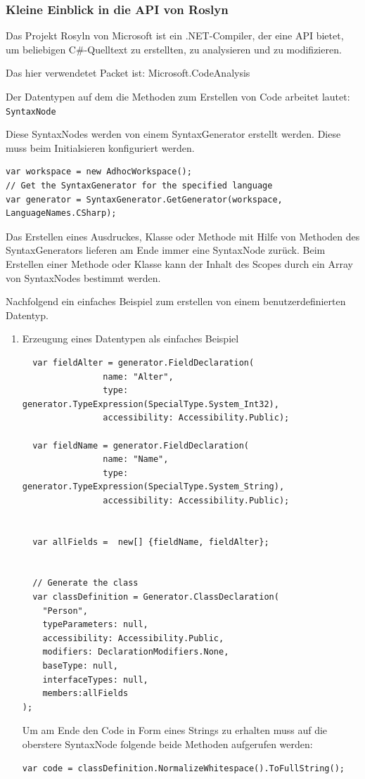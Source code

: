\documentclass[11pt]{article}
\begin{document}
\subsubsection{Kleine Einblick in die API von Roslyn}
\label{sec:orgheadline42}
Das Projekt Rosyln von Microsoft ist ein .NET-Compiler, der eine API bietet, um beliebigen C\#-Quelltext zu erstellten,
zu analysieren und zu modifizieren.

Das hier verwendetet Packet ist: Microsoft.CodeAnalysis

Der Datentypen auf dem die Methoden zum Erstellen von Code arbeitet lautet:
\texttt{SyntaxNode} 

Diese SyntaxNodes werden von einem SyntaxGenerator erstellt werden.
Diese muss beim Initialsieren konfiguriert werden.

\begin{verbatim}
var workspace = new AdhocWorkspace();
// Get the SyntaxGenerator for the specified language
var generator = SyntaxGenerator.GetGenerator(workspace, LanguageNames.CSharp);
\end{verbatim}


Das Erstellen eines Ausdruckes, Klasse oder Methode mit Hilfe von Methoden
des SyntaxGenerators lieferen am Ende immer eine SyntaxNode zurück.
Beim Erstellen einer Methode oder Klasse kann der Inhalt des Scopes durch
ein Array von SyntaxNodes bestimmt werden.

Nachfolgend ein einfaches Beispiel zum erstellen von einem
benutzerdefinierten Datentyp.

\begin{enumerate}
\item Erzeugung eines Datentypen als einfaches Beispiel
\label{sec:orgheadline41}

\begin{verbatim}
  var fieldAlter = generator.FieldDeclaration(
                name: "Alter",
                type: generator.TypeExpression(SpecialType.System_Int32),
                accessibility: Accessibility.Public);

  var fieldName = generator.FieldDeclaration(
                name: "Name",
                type: generator.TypeExpression(SpecialType.System_String),
                accessibility: Accessibility.Public);


  var allFields =  new[] {fieldName, fieldAlter};


  // Generate the class
  var classDefinition = Generator.ClassDeclaration(
    "Person", 
    typeParameters: null,
    accessibility: Accessibility.Public,
    modifiers: DeclarationModifiers.None,
    baseType: null,
    interfaceTypes: null,
    members:allFields
);
\end{verbatim}

Um am Ende den Code in Form eines Strings zu erhalten muss auf die oberstere
SyntaxNode folgende beide Methoden aufgerufen werden:

\begin{verbatim}
var code = classDefinition.NormalizeWhitespace().ToFullString();
\end{verbatim}
\end{enumerate}
\end{document}

